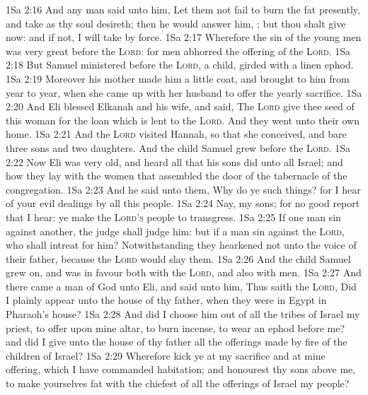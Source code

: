 \vs 1Sa 2:16 And  any man said unto him, Let them not fail to burn the fat presently, and  take  as thy soul desireth; then he would answer him, ; but thou shalt give  now: and if not, I will take  by force.
\vs 1Sa 2:17 Wherefore the sin of the young men was very great before the \textsc{Lord}: for men abhorred the offering of the \textsc{Lord}.
\vs 1Sa 2:18 But Samuel ministered before the \textsc{Lord},  a child, girded with a linen ephod.
\vs 1Sa 2:19 Moreover his mother made him a little coat, and brought  to him from year to year, when she came up with her husband to offer the yearly sacrifice.
\vs 1Sa 2:20 And Eli blessed Elkanah and his wife, and said, The \textsc{Lord} give thee seed of this woman for the loan which is lent to the \textsc{Lord}. And they went unto their own home.
\vs 1Sa 2:21 And the \textsc{Lord} visited Hannah, so that she conceived, and bare three sons and two daughters. And the child Samuel grew before the \textsc{Lord}.
\vs 1Sa 2:22 Now Eli was very old, and heard all that his sons did unto all Israel; and how they lay with the women that assembled  the door of the tabernacle of the congregation.
\vs 1Sa 2:23 And he said unto them, Why do ye such things? for I hear of your evil dealings by all this people.
\vs 1Sa 2:24 Nay, my sons; for  no good report that I hear: ye make the \textsc{Lord's} people to transgress.
\vs 1Sa 2:25 If one man sin against another, the judge shall judge him: but if a man sin against the \textsc{Lord}, who shall intreat for him? Notwithstanding they hearkened not unto the voice of their father, because the \textsc{Lord} would slay them.
\vs 1Sa 2:26 And the child Samuel grew on, and was in favour both with the \textsc{Lord}, and also with men.
\vs 1Sa 2:27 And there came a man of God unto Eli, and said unto him, Thus saith the \textsc{Lord}, Did I plainly appear unto the house of thy father, when they were in Egypt in Pharaoh's house?
\vs 1Sa 2:28 And did I choose him out of all the tribes of Israel  my priest, to offer upon mine altar, to burn incense, to wear an ephod before me? and did I give unto the house of thy father all the offerings made by fire of the children of Israel?
\vs 1Sa 2:29 Wherefore kick ye at my sacrifice and at mine offering, which I have commanded  habitation; and honourest thy sons above me, to make yourselves fat with the chiefest of all the offerings of Israel my people?
